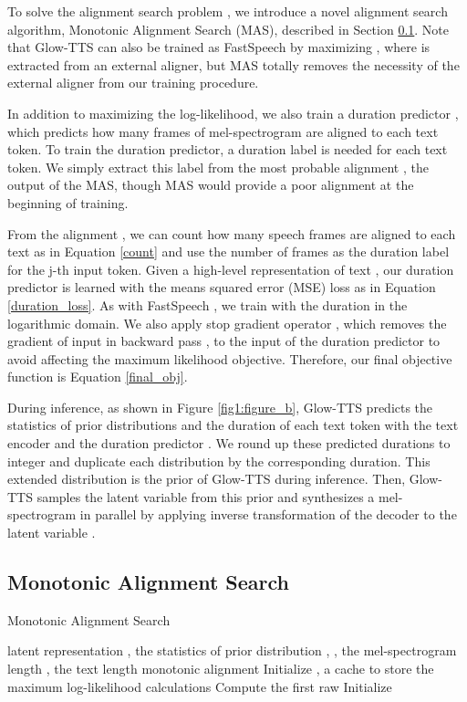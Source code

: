 \documentclass{article}
\begin{document}
To solve the alignment search problem , we introduce a novel alignment search algorithm, Monotonic Alignment Search (MAS), described in Section \ref{3.2}. Note that Glow-TTS can also be trained as FastSpeech by maximizing , where  is extracted from an external aligner, but MAS totally removes the necessity of the external aligner from our training procedure.

In addition to maximizing the log-likelihood, we also train a duration predictor , which predicts how many frames of mel-spectrogram are aligned to each text token. To train the duration predictor, a duration label is needed for each text token. We simply extract this label from the most probable alignment , the output of the MAS, though MAS would provide a poor alignment at the beginning of training.

From the alignment , we can count how many speech frames are aligned to each text as in Equation \ref{count} and use the number of frames  as the duration label for the j-th input token. Given a high-level representation of text , our duration predictor  is learned with the means squared error (MSE) loss as in Equation \ref{duration_loss}. As with FastSpeech \cite{ren2019fastspeech}, we train  with the duration  in the logarithmic domain. We also apply stop gradient operator , which removes the gradient of input in backward pass \cite{oord2017neural}, to the input of the duration predictor to avoid affecting the maximum likelihood objective. Therefore, our final objective function is Equation \ref{final_obj}.







During inference, as shown in Figure \ref{fig1:figure_b}, Glow-TTS predicts the statistics of prior distributions and the duration of each text token with the text encoder  and the duration predictor . We round up these predicted durations to integer and duplicate each distribution by the corresponding duration. This extended distribution is the prior of Glow-TTS during inference. Then, Glow-TTS samples the latent variable  from this prior and synthesizes a mel-spectrogram in parallel by applying inverse transformation of the decoder  to the latent variable .


\subsection{Monotonic Alignment Search}
\label{3.2}

\begin{algorithm}[tb]
   \caption{Monotonic Alignment Search}
   \label{alg_mas}
\begin{algorithmic}
    latent representation , the statistics of prior distribution  , , the mel-spectrogram length , the text length 
    monotonic alignment 
   \STATE Initialize , a cache to store the maximum log-likelihood calculations
   \STATE Compute the first raw  
   \STATE 
   \ENDFOR
   \ENDFOR
   \STATE Initialize 
   \STATE 
   \ENDFOR
\end{algorithmic}
\end{algorithm}
\end{document}
